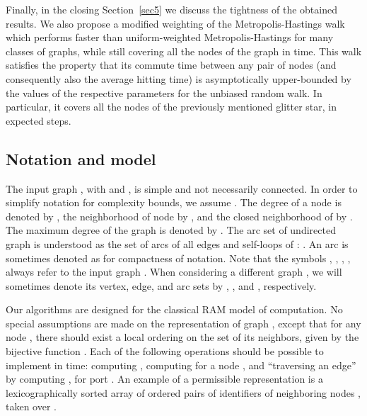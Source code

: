 \documentclass[11pt,a4paper]{article}
\renewcommand{\*}{\hspace*{5mm}}
\begin{document}
Finally, in the closing Section~\ref{sec5} we discuss the tightness of the obtained results. We also propose a modified weighting of the Metropolis-Hastings walk which performs faster than uniform-weighted Metropolis-Hastings for many classes of graphs, while still covering all the nodes of the graph in  time. This walk satisfies the property that its commute time between any pair of nodes (and consequently also the average hitting time) is asymptotically upper-bounded by the values of the respective parameters for the unbiased random walk. In particular, it covers all the nodes of the previously mentioned glitter star, in expected  steps.

\subsection{Notation and model}

The input graph , with  and , is simple and not necessarily connected. In order to simplify notation for complexity bounds, we assume . The degree of a node  is denoted by , the neighborhood of node  by , and  the closed neighborhood of  by . The maximum degree of the graph is denoted by . The arc set  of undirected graph  is understood as the set of arcs of all edges and self-loops of : . An arc  is sometimes denoted as  for compactness of notation. Note that the symbols , , , ,  always refer to the input graph . When considering a different graph , we will sometimes denote its vertex, edge, and arc sets by , , and , respectively. 

Our algorithms are designed for the classical RAM model of computation. No special assumptions are made on the representation of graph , except that for any node , there should exist a local ordering on the set of its neighbors, given by the bijective function . Each of the following operations should be possible to implement in  time: computing , computing  for a node , and ``traversing an edge'' by computing , for port . An example of a permissible representation is a lexicographically sorted array of ordered pairs of identifiers of neighboring nodes , taken over .
\end{document}

